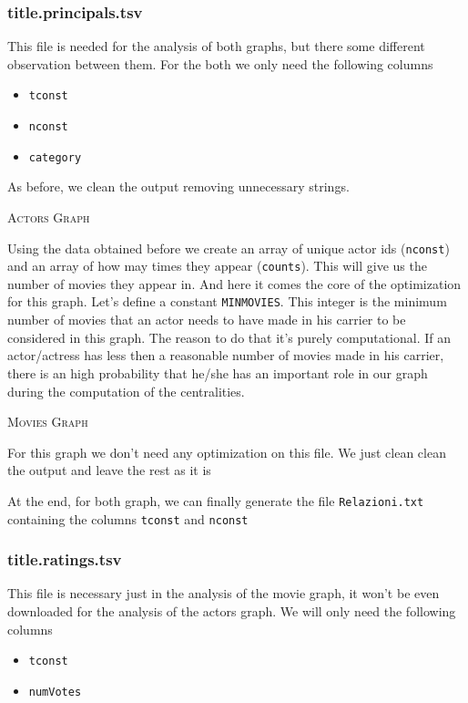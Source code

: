 \subsubsection{title.principals.tsv}

This file is needed for the analysis of both graphs, but there some different observation between them. For the both we only need the following columns

\begin{itemize}
    \item \texttt{tconst}
    \item \texttt{nconst}
    \item \texttt{category}
\end{itemize}

\noindent As before, we clean the output removing unnecessary strings. \s

\textsc{Actors Graph}
\s

\noindent Using the data obtained  before we create an array of unique actor ids (\texttt{nconst}) and an array of how may times they appear (\texttt{counts}). This will give us the number of movies they appear in. And here it comes the core of the optimization for this graph. Let's define a constant \texttt{MINMOVIES}. This integer is the minimum number of movies that an actor needs to have made in his carrier to be considered in this graph. The reason to do that it's purely computational. If an actor/actress has less then a reasonable number of movies made in his carrier, there is an high probability that he/she has an important role in our graph during the computation of the centralities. \s

\textsc{Movies Graph} \s

\noindent For this graph we don't need any optimization on this file. We just clean clean the output and leave the rest as it is \s

\nd At the end, for both graph, we can finally generate the file \texttt{Relazioni.txt} containing the columns \texttt{tconst} and \texttt{nconst}

\subsubsection{title.ratings.tsv}

This file is necessary just in the analysis of the movie graph, it won't be even downloaded for the analysis of the actors graph. We will only need the following columns

\begin{itemize}
    \item \texttt{tconst}
    \item \texttt{numVotes}
\end{itemize}

